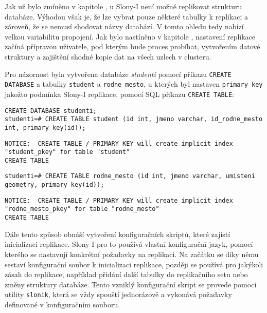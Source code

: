 
Jak už bylo zmíněno v kapitole , u Slony-I není možné replikovat strukturu databáze. Výhodou však je, že lze vybrat pouze některé tabulky k replikaci a zároveň, že se nemusí shodovat názvy databází. V tomto ohledu tedy nabízí velkou variabilitu propojení. Jak bylo nastíněno v kapitole , nastavení replikace začíná přípravou uživatele, pod kterým bude proces probíhat, vytvořením datové struktury a zajištění shodné kopie dat na všech uzlech v clusteru.

Pro názornost byla vytvořena databáze {\it studenti} pomocí příkazu \texttt{CREATE DATABASE} a  tabulky \texttt{student} a \texttt{rodne\_mesto}, u kterých byl nastaven \texttt{primary key} jakožto podmínka Slony-I replikace, pomocí SQL příkazu \texttt{CREATE TABLE}:

\begin{lstlisting}
CREATE DATABASE studenti;
studenti=# CREATE TABLE student (id int, jmeno varchar, id_rodne_mesto int, primary key(id));
\end{lstlisting}
\begin{lstlisting}[keywordstyle=\color{black},identifierstyle=\color{black},stringstyle=\color{black}]
NOTICE:  CREATE TABLE / PRIMARY KEY will create implicit index "student_pkey" for table "student"
CREATE TABLE
\end{lstlisting}
\begin{lstlisting}
studenti=# CREATE TABLE rodne_mesto (id int, jmeno varchar, umisteni geometry, primary key(id));
\end{lstlisting}
\begin{lstlisting}[keywordstyle=\color{black},identifierstyle=\color{black},stringstyle=\color{black}]
NOTICE:  CREATE TABLE / PRIMARY KEY will create implicit index "rodne_mesto_pkey" for table "rodne_mesto"
CREATE TABLE
\end{lstlisting}


Dále tento způsob obnáší vytvoření konfiguračních skriptů, které zajistí inicializaci replikace. Slony-I pro to používá vlastní konfigurační jazyk, pomocí kterého se nastavují konkrétní požadavky na replikaci. Na začátku se díky němu sestaví konfigurační soubor k inicializaci replikace, později se používá pro jakýkoli zásah do replikace, například přidání další tabulky do replikačního setu nebo změny struktury databáze. Tento vzniklý konfigurační skript se provede pomocí utility \texttt{slonik}, která se vždy spouští jednorázově a vykonává požadavky definované v konfiguračním souboru. 

